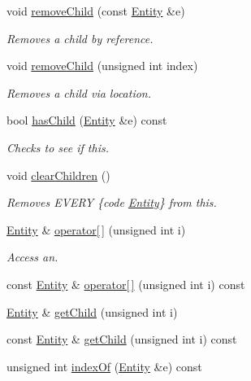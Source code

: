 \begin{DoxyCompactItemize}
void \hyperlink{classmc_1_1_container_ab11d68dc07cd15d6a8a30f63fb8aaa62}{remove\+Child} (const \hyperlink{classmc_1_1_entity}{Entity} \&e)
\begin{DoxyCompactList}\small\item\em Removes a child by reference. \end{DoxyCompactList}\item 
void \hyperlink{classmc_1_1_container_a2a20247458c80d432a9c7d80f11a15ff}{remove\+Child} (unsigned int index)
\begin{DoxyCompactList}\small\item\em Removes a child via location. \end{DoxyCompactList}\item 
bool \hyperlink{classmc_1_1_container_a0f947d9066f457d37defd9382da99128}{has\+Child} (\hyperlink{classmc_1_1_entity}{Entity} \&e) const 
\begin{DoxyCompactList}\small\item\em Checks to see if this. \end{DoxyCompactList}\item 
void \hyperlink{classmc_1_1_container_aee8b37e3cb3ef52d2b3aee2310007f39}{clear\+Children} ()
\begin{DoxyCompactList}\small\item\em Removes E\+V\+E\+RY \{code \hyperlink{classmc_1_1_entity}{Entity}\} from this. \end{DoxyCompactList}\item 
\hyperlink{classmc_1_1_entity}{Entity} \& \hyperlink{classmc_1_1_container_a4d9c9836fca7685c9e3fd314cb2ef3e4}{operator\mbox{[}$\,$\mbox{]}} (unsigned int i)
\begin{DoxyCompactList}\small\item\em Access an. \end{DoxyCompactList}\item 
const \hyperlink{classmc_1_1_entity}{Entity} \& \hyperlink{classmc_1_1_container_a9a7c43110b0b08ac5edbbfd0a668abe0}{operator\mbox{[}$\,$\mbox{]}} (unsigned int i) const 
\item 
\hyperlink{classmc_1_1_entity}{Entity} \& \hyperlink{classmc_1_1_container_a0f7ec1b14def81f1fbc4e534b7cff8be}{get\+Child} (unsigned int i)
\item 
const \hyperlink{classmc_1_1_entity}{Entity} \& \hyperlink{classmc_1_1_container_af5953e37ee8a9c24a4541e81502e9639}{get\+Child} (unsigned int i) const 
\item 
unsigned int \hyperlink{classmc_1_1_container_ac3b24eb59ccbca4290d032c07eb3e5f6}{index\+Of} (\hyperlink{classmc_1_1_entity}{Entity} \&e) const 

\end{DoxyCompactItemize}
